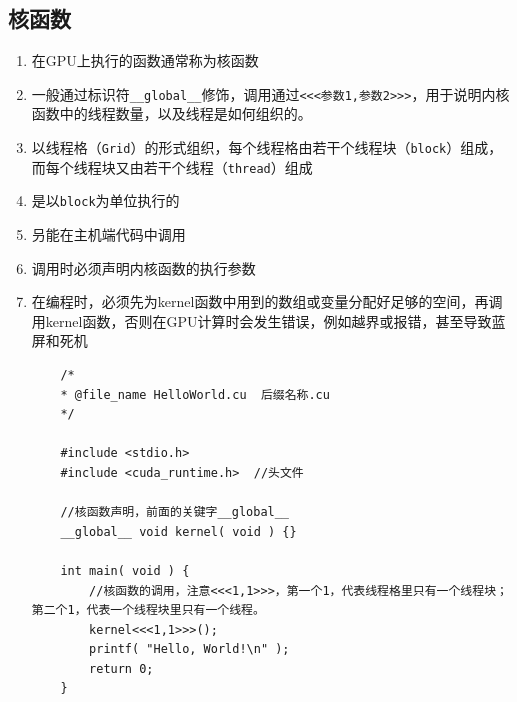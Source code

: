 \documentclass[UTF8,a4paper,12pt]{ctexbook}
\begin{document}
		\subsection{核函数}
			\begin{enumerate}
				\item 在GPU上执行的函数通常称为核函数
				\item 一般通过标识符\verb|__global__|修饰，调用通过\verb|<<<参数1,参数2>>>|，用于说明内核函数中的线程数量，以及线程是如何组织的。
				\item 以线程格（\verb|Grid|）的形式组织，每个线程格由若干个线程块（\verb|block|）组成，而每个线程块又由若干个线程（\verb|thread|）组成
				\item 是以\verb|block|为单位执行的
				\item 叧能在主机端代码中调用
				\item 调用时必须声明内核函数的执行参数
				\item 在编程时，必须先为kernel函数中用到的数组或变量分配好足够的空间，再调用kernel函数，否则在GPU计算时会发生错误，例如越界或报错，甚至导致蓝屏和死机
				
				\begin{lstlisting}
	/*
	* @file_name HelloWorld.cu  后缀名称.cu
	*/
	
	#include <stdio.h>
	#include <cuda_runtime.h>  //头文件
	
	//核函数声明，前面的关键字__global__
	__global__ void kernel( void ) {}
	
	int main( void ) {
		//核函数的调用，注意<<<1,1>>>，第一个1，代表线程格里只有一个线程块；第二个1，代表一个线程块里只有一个线程。
		kernel<<<1,1>>>();
		printf( "Hello, World!\n" );
		return 0;
	}
				\end{lstlisting}
			\end{enumerate}
\end{document}
